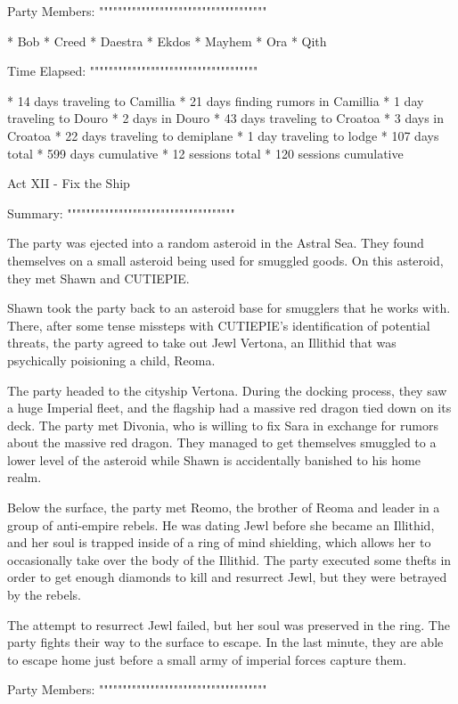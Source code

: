 Party Members:
""""""""""""""""""""""""""""""""""""

  * Bob
  * Creed
  * Daestra
  * Ekdos
  * Mayhem
  * Ora
  * Qith

Time Elapsed:
""""""""""""""""""""""""""""""""""""

  * 14 days traveling to Camillia
  * 21 days finding rumors in Camillia
  * 1 day traveling to Douro
  * 2 days in Douro
  * 43 days traveling to Croatoa
  * 3 days in Croatoa
  * 22 days traveling to demiplane
  * 1 day traveling to lodge
  * 107 days total
  * 599 days cumulative
  * 12 sessions total
  * 120 sessions cumulative

Act XII - Fix the Ship
^^^^^^^^^^^^^^^^^^^^^^^^^^^^^^^^^^^^

Summary:
""""""""""""""""""""""""""""""""""""

The party was ejected into a random asteroid in the Astral Sea.
They found themselves on a small asteroid being used for smuggled goods.
On this asteroid, they met Shawn and CUTIEPIE.

Shawn took the party back to an asteroid base for smugglers that he works with.
There, after some tense missteps with CUTIEPIE's identification of potential threats, the party agreed to take out Jewl Vertona, an Illithid that was psychically poisioning a child, Reoma.

The party headed to the cityship Vertona.
During the docking process, they saw a huge Imperial fleet, and the flagship had a massive red dragon tied down on its deck.
The party met Divonia, who is willing to fix Sara in exchange for rumors about the massive red dragon.
They managed to get themselves smuggled to a lower level of the asteroid while Shawn is accidentally banished to his home realm.

Below the surface, the party met Reomo, the brother of Reoma and leader in a group of anti-empire rebels.
He was dating Jewl before she became an Illithid, and her soul is trapped inside of a ring of mind shielding, which allows her to occasionally take over the body of the Illithid.
The party executed some thefts in order to get enough diamonds to kill and resurrect Jewl, but they were betrayed by the rebels.

The attempt to resurrect Jewl failed, but her soul was preserved in the ring.
The party fights their way to the surface to escape.
In the last minute, they are able to escape home just before a small army of imperial forces capture them.

Party Members:
""""""""""""""""""""""""""""""""""""

